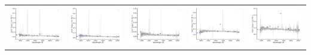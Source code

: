 \begin{center}
\begin{longtable}{l l l l l }
    \includegraphics[width=0.19\linewidth, clip]{Figs/Figs-sdss/spec-1512-53742-0351-STRIPE82-0061-059714.pdf} & \includegraphics[width=0.19\linewidth, clip]{Figs/Figs-sdss/spec-1512-53742-0430-STRIPE82-0064-022463.pdf} & \includegraphics[width=0.19\linewidth, clip]{Figs/Figs-sdss/spec-1512-53742-0471-STRIPE82-0064-008459.pdf} & \includegraphics[width=0.19\linewidth, clip]{Figs/Figs-sdss/spec-1558-53271-0059-STRIPE82-0053-022298.pdf} & \includegraphics[width=0.19\linewidth, clip]{Figs/Figs-sdss/spec-1829-53494-0276-SPLUS-n05n53-037456.pdf} \\

\end{longtable}
\end{center}
